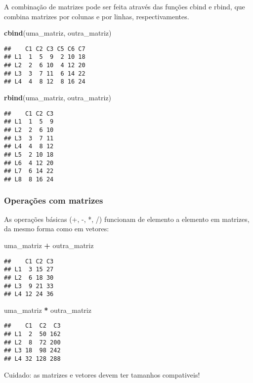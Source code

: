\documentclass[
]{book}
\newenvironment{Shaded}{\begin{snugshade}}{\end{snugshade}}
\newcommand{\FunctionTok}[1]{\textcolor[rgb]{0.13,0.29,0.53}{\textbf{#1}}}
\newcommand{\NormalTok}[1]{#1}
\newcommand{\SpecialCharTok}[1]{\textcolor[rgb]{0.81,0.36,0.00}{\textbf{#1}}}
\begin{document}
A combinação de matrizes pode ser feita através das funções cbind e rbind, que combina matrizes por colunas e por linhas, respectivamentes.

\begin{Shaded}
\begin{Highlighting}[]
\FunctionTok{cbind}\NormalTok{(uma\_matriz, outra\_matriz)}
\end{Highlighting}
\end{Shaded}

\begin{verbatim}
##    C1 C2 C3 C5 C6 C7
## L1  1  5  9  2 10 18
## L2  2  6 10  4 12 20
## L3  3  7 11  6 14 22
## L4  4  8 12  8 16 24
\end{verbatim}

\begin{Shaded}
\begin{Highlighting}[]
\FunctionTok{rbind}\NormalTok{(uma\_matriz, outra\_matriz)}
\end{Highlighting}
\end{Shaded}

\begin{verbatim}
##    C1 C2 C3
## L1  1  5  9
## L2  2  6 10
## L3  3  7 11
## L4  4  8 12
## L5  2 10 18
## L6  4 12 20
## L7  6 14 22
## L8  8 16 24
\end{verbatim}

\subsubsection{Operações com matrizes}\label{operauxe7uxf5es-com-matrizes}

As operações básicas (+, -, *, /) funcionam de elemento a elemento em matrizes, da mesmo forma como em vetores:

\begin{Shaded}
\begin{Highlighting}[]
\NormalTok{uma\_matriz }\SpecialCharTok{+}\NormalTok{ outra\_matriz}
\end{Highlighting}
\end{Shaded}

\begin{verbatim}
##    C1 C2 C3
## L1  3 15 27
## L2  6 18 30
## L3  9 21 33
## L4 12 24 36
\end{verbatim}

\begin{Shaded}
\begin{Highlighting}[]
\NormalTok{uma\_matriz }\SpecialCharTok{*}\NormalTok{ outra\_matriz}
\end{Highlighting}
\end{Shaded}

\begin{verbatim}
##    C1  C2  C3
## L1  2  50 162
## L2  8  72 200
## L3 18  98 242
## L4 32 128 288
\end{verbatim}

Cuidado: as matrizes e vetores devem ter tamanhos compativeis!

  
\end{document}

